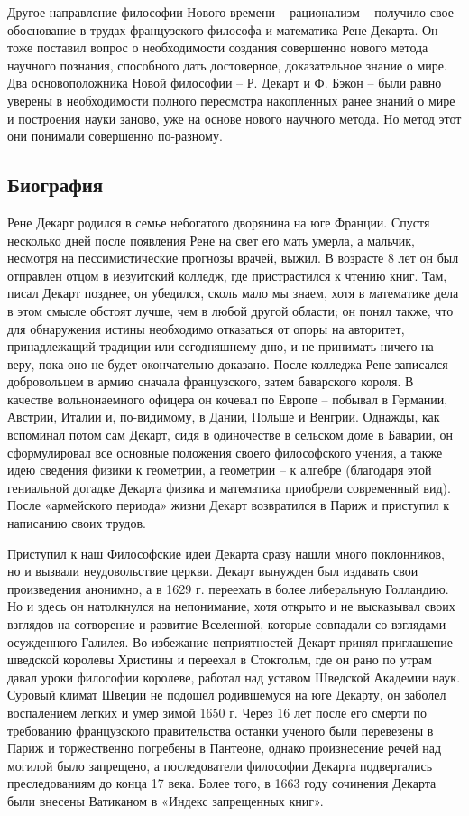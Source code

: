 \documentclass[a4paper, 14pt]{extreport}
\begin{document}
Другое направление философии Нового времени -- рационализм -- получило
свое обоснование в трудах французского философа и математика Рене
Декарта. Он тоже поставил вопрос о необходимости создания совершенно
нового метода научного познания, способного дать достоверное,
доказательное знание о мире. Два основоположника Новой философии -- Р.
Декарт и Ф. Бэкон -- были равно уверены в необходимости полного
пересмотра накопленных ранее знаний о мире и построения науки заново,
уже на основе нового научного метода. Но метод этот они понимали
совершенно по-разному.

\subsection{Биография}

Рене Декарт родился в семье небогатого дворянина на юге Франции. Спустя
несколько дней после появления Рене на свет его мать умерла, а мальчик,
несмотря на пессимистические прогнозы врачей, выжил. В возрасте 8 лет он
был отправлен отцом в иезуитский колледж, где пристрастился к чтению
книг. Там, писал Декарт позднее, он убедился, сколь мало мы знаем, хотя
в математике дела в этом смысле обстоят лучше, чем в любой другой
области; он понял также, что для обнаружения истины необходимо
отказаться от опоры на авторитет, принадлежащий традиции или
сегодняшнему дню, и не принимать ничего на веру, пока оно не будет
окончательно доказано. После колледжа Рене записался добровольцем в
армию сначала французского, затем баварского короля. В качестве
вольнонаемного офицера он кочевал по Европе -- побывал в Германии,
Австрии, Италии и, по-видимому, в Дании, Польше и Венгрии. Однажды, как
вспоминал потом сам Декарт, сидя в одиночестве в сельском доме в
Баварии, он сформулировал все основные положения своего философского
учения, а также идею сведения физики к геометрии, а геометрии -- к
алгебре (благодаря этой гениальной догадке Декарта физика и математика
приобрели современный вид). После «армейского периода» жизни Декарт
возвратился в Париж и приступил к написанию своих трудов.

Приступил к наш Философские идеи Декарта сразу нашли много поклонников,
но и вызвали неудовольствие церкви. Декарт вынужден был издавать свои
произведения анонимно, а в 1629 г. переехать в более либеральную
Голландию. Но и здесь он натолкнулся на непонимание, хотя открыто и не
высказывал своих взглядов на сотворение и развитие Вселенной, которые
совпадали со взглядами осужденного Галилея. Во избежание неприятностей
Декарт принял приглашение шведской королевы Христины и переехал в
Стокгольм, где он рано по утрам давал уроки философии королеве, работал
над уставом Шведской Академии наук. Суровый климат Швеции не подошел
родившемуся на юге Декарту, он заболел воспалением легких и умер зимой
1650 г. Через 16 лет после его смерти по требованию французского
правительства останки ученого были перевезены в Париж и торжественно
погребены в Пантеоне, однако произнесение речей над могилой было
запрещено, а последователи философии Декарта подвергались преследованиям
до конца 17 века. Более того, в 1663 году сочинения Декарта были внесены
Ватиканом в «Индекс запрещенных книг».
\end{document}
